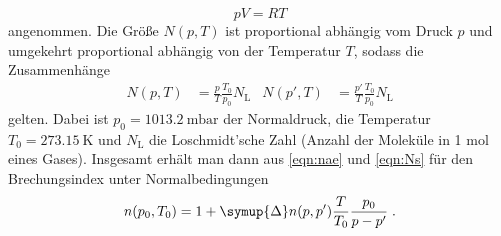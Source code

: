 \begin{equation}
    p V = R T 
\end{equation}
angenommen. Die Größe $N(p,T)$ ist proportional abhängig vom Druck $p$ und umgekehrt proportional abhängig von der Temperatur $T$, sodass die Zusammenhänge
\begin{align}
    \label{eqn:Ns}
    N(p,T) &= \frac{p}{T} \frac{T_0}{p_0} N_\text{L} & N(p',T) &= \frac{p'}{T} \frac{T_0}{p_0} N_\text{L}
\end{align}
gelten.
Dabei ist $p_0 = \SI{1013.2}{\milli\bar}$ der Normaldruck,
die Temperatur $T_0 = \SI{273.15}{\kelvin}$
und $N_\text{L}$ die Loschmidt'sche Zahl (Anzahl der Moleküle in 1 mol eines Gases).
Insgesamt erhält man dann aus \autoref{eqn:nae} und \autoref{eqn:Ns} für den Brechungsindex unter Normalbedingungen
    \begin{equation}
        \label{eqn:brechungsindex}
        n(p_0,T_0) = 1 + \symup{\Delta}n(p,p') \frac{T}{T_0} \frac{p_0}{p - p'} \; .
    \end{equation}
        